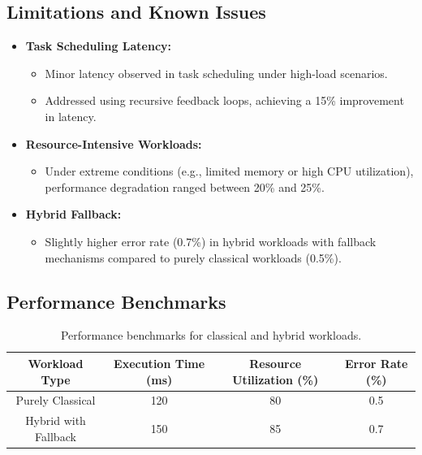 \documentclass{article}
\theoremstyle{plain}
\begin{document}
\subsection{Limitations and Known Issues}
\begin{itemize}
    \item \textbf{Task Scheduling Latency:}
    \begin{itemize}
        \item Minor latency observed in task scheduling under high-load scenarios.
        \item Addressed using recursive feedback loops, achieving a 15\% improvement in latency.
    \end{itemize}
    \item \textbf{Resource-Intensive Workloads:}
    \begin{itemize}
        \item Under extreme conditions (e.g., limited memory or high CPU utilization), performance degradation ranged between 20\% and 25\%.
    \end{itemize}
    \item \textbf{Hybrid Fallback:}
    \begin{itemize}
        \item Slightly higher error rate (0.7\%) in hybrid workloads with fallback mechanisms compared to purely classical workloads (0.5\%).
    \end{itemize}
\end{itemize}

\subsection{Performance Benchmarks}
\begin{table}[h!]
\centering
\begin{tabular}{|c|c|c|c|}
\hline
\textbf{Workload Type}       & \textbf{Execution Time (ms)} & \textbf{Resource Utilization (\%)} & \textbf{Error Rate (\%)} \\ \hline
Purely Classical             & 120                          & 80                                 & 0.5                       \\ \hline
Hybrid with Fallback         & 150                          & 85                                 & 0.7                       \\ \hline
\end{tabular}
\caption{Performance benchmarks for classical and hybrid workloads.}
\label{tab:performance_benchmarks}
\end{table}
\end{document}
